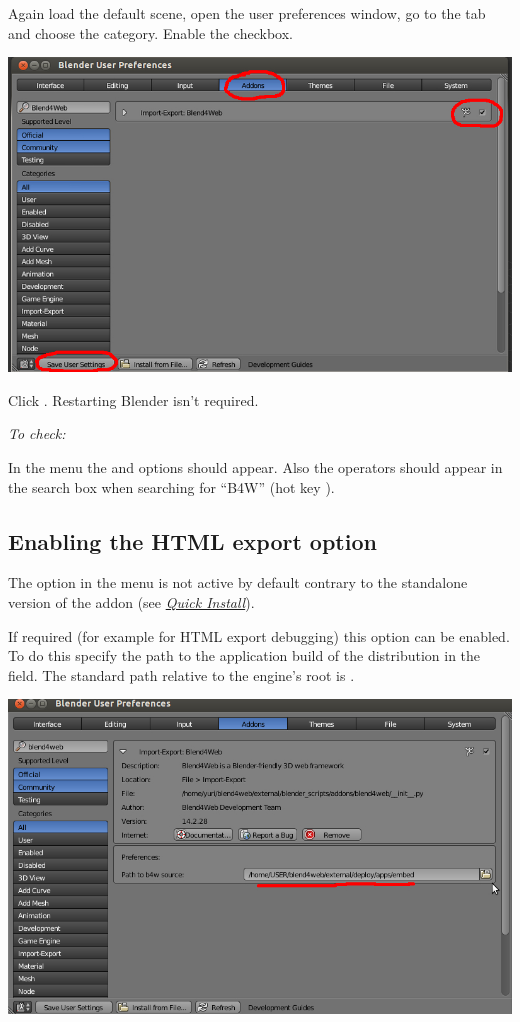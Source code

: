\documentclass[a4paper,12pt,oneside]{sphinxmanual}
\begin{document}
Again load the default scene, open the user preferences window, go to the  tab and choose the  category. Enable the  checkbox.

{\hfill\includegraphics[width=1.000\linewidth]{user_preferences_enable_addon.jpg}\hfill}

Click . Restarting Blender isn't required.

\emph{To check:}

In the  menu the  and  options should appear. Also the operators should appear in the search box when searching for ``B4W'' (hot key ).


\subsection{Enabling the HTML export option}
\label{setup:html}
The  option in the  menu is not active by default contrary to the standalone version of the addon (see {\hyperref[first_steps:first-steps]{\emph{Quick Install}}}).

If required (for example for HTML export debugging) this option can be enabled. To do this specify the path to the  application build of the distribution in the  field. The standard path relative to the engine's root is .

{\hfill\includegraphics[width=1.000\linewidth]{user_preferences_enable_addon_HTML_option.jpg}\hfill}
\end{document}
